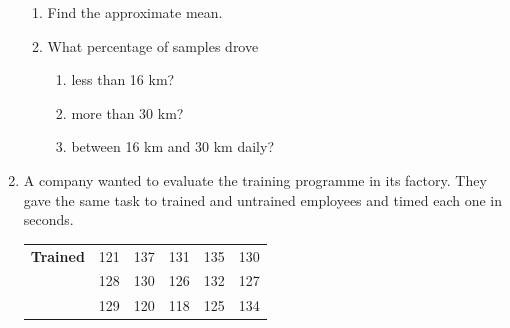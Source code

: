 \begin{description}[noitemsep]
\begin{description}[noitemsep]
\begin{enumerate}[noitemsep, label=\textbf{\arabic*}. ]
\begin{table}
\end{table}
    \par
  \label{m39404*id217956}\begin{enumerate}[noitemsep, label=\textbf{\alph*}. ] 
            \label{m39404*uid142}\item Find the approximate mean.
\label{m39404*uid143}\item What percentage of samples drove
\label{m39404*id217984}\begin{enumerate}[noitemsep, label=\textbf{\roman*}. ] 
            \label{m39404*uid144}\item less than 16 km?
\label{m39404*uid145}\item more than 30 km?
\label{m39404*uid146}\item between 16 km and 30 km daily?
\end{enumerate}
        \end{enumerate}
                \label{m39404*uid147}\item A company wanted to evaluate the training programme in its factory. They gave the same task to trained and untrained employees and timed each one in seconds.
          \begin{table}
        \begin{center}
      \label{m39404*id218040}
    \noindent
      \tablelasttail{}
      \begin{xtabular}[t]{|l|l|l|l|l|l|}\hline
        \textbf{Trained} &
        121 &
        137 &
        131 &
        135 &
        130%
     \tabularnewline{}
         &
        128 &
        130 &
        126 &
        132 &
        127%
     \tabularnewline{}
         &
        129 &
        120 &
        118 &
        125 &
        134%
     \tabularnewline{}

\end{xtabular}
\end{center}
\end{table}
\end{enumerate}
\end{description}
\end{description}
